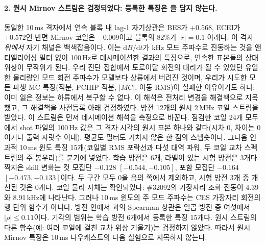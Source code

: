 \documentclass[10pt,a4paper]{article}
\begin{document}
\paragraph{2. 원시 Mirnov 스트림은 검정되었다: 등록한 특징은 \Vrot{}을 담지 않는다.}
동일한 10\,ms 격자에서 연속 블록 내 lag-1 자기상관은 BES가 $+0.568$,
ECEI가 $+0.572$인 반면 Mirnov 코일은 $-0.009$이고 블록의 82\%가
$|r| = 0.1$ 아래다: 이 격자 \emph{위에서} 자기 채널은 백색잡음이다. 이는
$\mathrm{d}B/\mathrm{d}t$가 kHz 모드 주파수로 진동하는 것을 앤티앨리어싱 필터
없이 100\,Hz로 데시메이션한 결과의 특징으로, 연속한 표본들의 상대 위상이
무작위가 된다. 우리 진단 집합에서 토로이달 회전의 대리가 될 수 있었던 유일한
물리량인 모드 회전 주파수가 모델보다 상류에서 버려진 것이며, 우리가 시도한 모든
파생 MC 특징(적분, PCHIP 적분, $|MC|$, 이동 RMS)이 실패한 이유이기도 하다: 이미
잃은 정보는 하류에서 복구할 수 없다. 이 해석은 전처리 변경을 해결책으로 지목했고,
그 해결책을 사전등록 아래 검정하였다. 방전 12개의 원시 2\,MHz 코일 스트림을 받았다.
이 스트림은 먼저 데시메이션 해석을 측정으로 바꾼다. 점검한 코일 24개 모두에서 shot
파일의 100\,Hz 값은 그 격자 시각의 원시 표본 하나와 같다(시차 0, 차이는 0이거나 출력
자릿수 이내). 평균도 필터도 거치지 않은 한 점의 스냅숏이다. 그다음
인과적 10\,ms 윈도 특징 15개(코일별 RMS 포락선과 다섯 대역 파워, 두 코일 교차
스펙트럼의 주 봉우리)를 \Vrot{} 분기에 넣었다. 학습 방전은 6개, \Vrot{} 라벨이 있는
시험 방전은 3개다. 짝지은 \Vrot{} skill 변화는 컷 모집단 $-0.128$
$[-0.544, -0.105]$, 포함 모집단 $-0.164$ $[-0.473, -0.133]$이다. 두 구간 모두 0을
음의 쪽에서 제외하고, 시험 방전 3개 중 개선된 것은 0개다. 코일 물리 자체는
확인되었다: \#32092의 가장자리 조화 진동이 4.39와 8.91\,kHz에 나타난다. 그러나
10\,ms 윈도의 주 모드 주파수는 CES 가장자리 회전의 행 단위 함수가 아니다. 방전 안에서
\Vrot{}과의 Spearman 상관은 일곱 방전 중 여섯에서 $|\rho| \leq 0.11$이다. 기각의
범위는 학습 방전 6개에서 등록한 특징 15개다. 원시 스트림의 다른 함수(예: 여러 코일에
걸친 교차 위상 기울기)는 검정하지 않았다. 따라서 원시 Mirnov 특징은 10\,ms \Vrot{}
나우캐스트의 다음 실험으로 지목하지 않는다.
\end{document}
